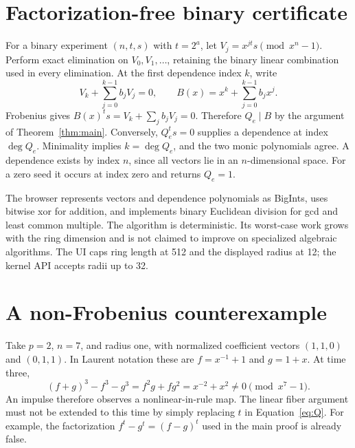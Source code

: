 \documentclass{ijuc}
\begin{document}
\clearpage
\appendix
\section{Factorization-free binary certificate}\label{app:krylov}
For a binary experiment $(n,t,s)$ with $t=2^a$, let $V_j=x^{jt}s\pmod{x^n-1}$. Perform exact elimination on $V_0,V_1,\ldots$, retaining the binary linear combination used in every elimination. At the first dependence index $k$, write
\begin{equation}
 V_k+\sum_{j=0}^{k-1}b_jV_j=0,
 \qquad B(x)=x^k+\sum_{j=0}^{k-1}b_jx^j.
\end{equation}
Frobenius gives $B(x)^t s=V_k+\sum_j b_jV_j=0$. Therefore $Q_e\mid B$ by the argument of Theorem~\ref{thm:main}. Conversely, $Q_e^t s=0$ supplies a dependence at index $\deg Q_e$. Minimality implies $k=\deg Q_e$, and the two monic polynomials agree. A dependence exists by index $n$, since all vectors lie in an $n$-dimensional space. For a zero seed it occurs at index zero and returns $Q_e=1$.

The browser represents vectors and dependence polynomials as BigInts, uses bitwise xor for addition, and implements binary Euclidean division for gcd and least common multiple. The algorithm is deterministic. Its worst-case work grows with the ring dimension and is not claimed to improve on specialized algebraic algorithms. The UI caps ring length at 512 and the displayed radius at 12; the kernel API accepts radii up to 32.

\section{A non-Frobenius counterexample}
Take $p=2$, $n=7$, and radius one, with normalized coefficient vectors $(1,1,0)$ and $(0,1,1)$. In Laurent notation these are $f=x^{-1}+1$ and $g=1+x$. At time three,
\begin{equation}
 (f+g)^3-f^3-g^3=f^2g+fg^2
  =x^{-2}+x^2\neq0\pmod{x^7-1}.
\end{equation}
An impulse therefore observes a nonlinear-in-rule map. The linear fiber argument must not be extended to this time by simply replacing $t$ in Equation~\eqref{eq:Q}. For example, the factorization $f^t-g^t=(f-g)^t$ used in the main proof is already false.

\clearpage
\end{document}
